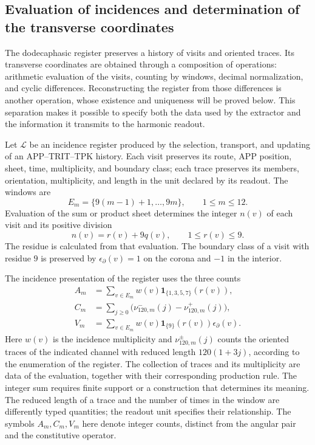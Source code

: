 \subsection{Evaluation of incidences and determination of the transverse coordinates}
\label{iii:r25:incidencias}

The dodecaphasic register preserves a history of visits and oriented
traces. Its transverse coordinates are obtained through a composition
of operations: arithmetic evaluation of the visits, counting by windows,
decimal normalization, and cyclic differences.
Reconstructing the register from those differences is another operation,
whose existence and uniqueness will be proved below.
This separation makes it possible to specify both the data used by the
extractor and the information it transmits to the harmonic readout.

Let $\mathscr L$ be an incidence register produced by the selection,
transport, and updating of an APP--TRIT--TPK history.
Each visit preserves its route, APP position, sheet, time,
multiplicity, and boundary class; each trace preserves its members,
orientation, multiplicity, and length in the unit declared by its
readout. The windows are
\[
 E_m=\{9(m-1)+1,\ldots,9m\},\qquad 1\leq m\leq12.
\]
Evaluation of the sum or product sheet determines the integer
$n(v)$ of each visit and its positive division
\[
 n(v)=r(v)+9q(v),\qquad 1\leq r(v)\leq9.
\]
The residue is calculated from that evaluation. The boundary class of
a visit with residue $9$ is preserved by
$\epsilon_\partial(v)=1$ on the corona and $-1$ in the interior.

The incidence presentation of the register uses the three counts
\begin{align}
 A_m&=\sum_{v\in E_m}w(v)
       \mathbf1_{\{1,3,5,7\}}(r(v)),\label{iii:r25:recuento-a}\\
 C_m&=\sum_{j\geq0}
       \bigl(\nu^-_{120,m}(j)-\nu^+_{120,m}(j)\bigr),
       \label{iii:r25:recuento-c}\\
 V_m&=\sum_{v\in E_m}w(v)
       \mathbf1_{\{9\}}(r(v))\epsilon_\partial(v).
       \label{iii:r25:recuento-v}
\end{align}
Here $w(v)$ is the incidence multiplicity and
$\nu^\pm_{120,m}(j)$ counts the oriented traces of the indicated
channel with reduced length $120(1+3j)$, according to the enumeration
of the register.
The collection of traces and its multiplicity are data of the evaluation,
together with their corresponding production rule. The integer sum requires
finite support or a construction that determines its meaning.
The reduced length of a trace and the number of times in the
window are differently typed quantities; the readout unit specifies
their relationship. The symbols $A_m,C_m,V_m$ here denote
integer counts, distinct from the angular pair and the constitutive operator.

